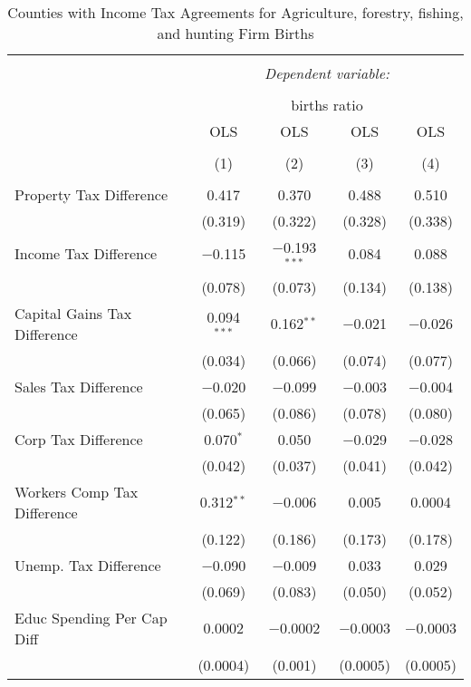 
\begin{table}[!htbp] \centering 
  \caption{Counties with Income Tax Agreements for  Agriculture, forestry, fishing, and hunting Firm Births} 
  \label{11rd} 
\begin{tabular}{@{\extracolsep{5pt}}lcccc} 
\\[-1.8ex]\hline 
\hline \\[-1.8ex] 
 & \multicolumn{4}{c}{\textit{Dependent variable:}} \\ 
\cline{2-5} 
\\[-1.8ex] & \multicolumn{4}{c}{births ratio} \\ 
 & OLS & OLS & OLS & OLS \\ 
\\[-1.8ex] & (1) & (2) & (3) & (4)\\ 
\hline \\[-1.8ex] 
 Property Tax Difference & 0.417 & 0.370 & 0.488 & 0.510 \\ 
  & (0.319) & (0.322) & (0.328) & (0.338) \\ 
  Income Tax Difference & $-$0.115 & $-$0.193$^{***}$ & 0.084 & 0.088 \\ 
  & (0.078) & (0.073) & (0.134) & (0.138) \\ 
  Capital Gains Tax Difference & 0.094$^{***}$ & 0.162$^{**}$ & $-$0.021 & $-$0.026 \\ 
  & (0.034) & (0.066) & (0.074) & (0.077) \\ 
  Sales Tax Difference & $-$0.020 & $-$0.099 & $-$0.003 & $-$0.004 \\ 
  & (0.065) & (0.086) & (0.078) & (0.080) \\ 
  Corp Tax Difference & 0.070$^{*}$ & 0.050 & $-$0.029 & $-$0.028 \\ 
  & (0.042) & (0.037) & (0.041) & (0.042) \\ 
  Workers Comp Tax Difference & 0.312$^{**}$ & $-$0.006 & 0.005 & 0.0004 \\ 
  & (0.122) & (0.186) & (0.173) & (0.178) \\ 
  Unemp. Tax Difference & $-$0.090 & $-$0.009 & 0.033 & 0.029 \\ 
  & (0.069) & (0.083) & (0.050) & (0.052) \\ 
  Educ Spending Per Cap Diff & 0.0002 & $-$0.0002 & $-$0.0003 & $-$0.0003 \\ 
  & (0.0004) & (0.001) & (0.0005) & (0.0005) \\ 

\end{tabular}
\end{table}
